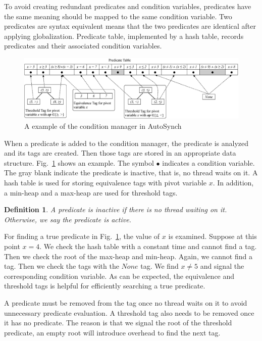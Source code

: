 \documentclass[preprint]{sigplanconf}
\newtheorem{definition}{Definition}
\begin{document}
To avoid creating redundant predicates and condition variables, predicates have 
the same meaning should be mapped to the same condition variable. Two 
predicates are syntax equivalent means that the two predicates
are identical after applying globalization. Predicate table, implemented by a
hash table, records predicates and their associated condition variables. 

\begin{figure}[ht!]
  \centering
  \includegraphics[width=180mm]{fig/manager.eps}
  \caption{A example of the condition manager in AutoSynch}
  \label{fig:mgr}
\end{figure}


When a predicate is added to the condition manager, the predicate is analyzed
and its tags are created. Then those tags are stored in an appropriate data
structure. Fig.~\ref{fig:mgr} shows an example. The symbol $\bullet$ indicates 
a condition variable. The gray blank indicate the predicate is inactive,
that is, no thread waits on it. A hash table is used for
storing equivalence tags with pivot variable $x$. In addition, a min-heap and a
max-heap are used for threshold tags. 

\begin{definition}
    A predicate is inactive if there is no thread waiting on it. Otherwise, we
    say the predicate is active.
\end{definition}


For finding a true predicate in Fig.~\ref{fig:mgr}, the value of $x$ is 
examined. Suppose at this point $x=4$. We check the hash table with a
constant time and cannot find a tag. Then we check the root of the max-heap and 
min-heap. Again, we cannot find a tag. Then we check the tags with the $None$
tag. We find $x \ne 5$ and signal the corresponding condition variable. As can
be expected, the equivalence and threshold tags is helpful for efficiently
searching a true predicate.  


A predicate must be removed from the tag once no thread waits on 
it to avoid unnecessary predicate evaluation. A threshold tag also needs to be
removed once it has no predicate. The reason is that 
we signal the root of the threshold predicate, an empty root 
will introduce overhead to find the next tag. 
\end{document}
